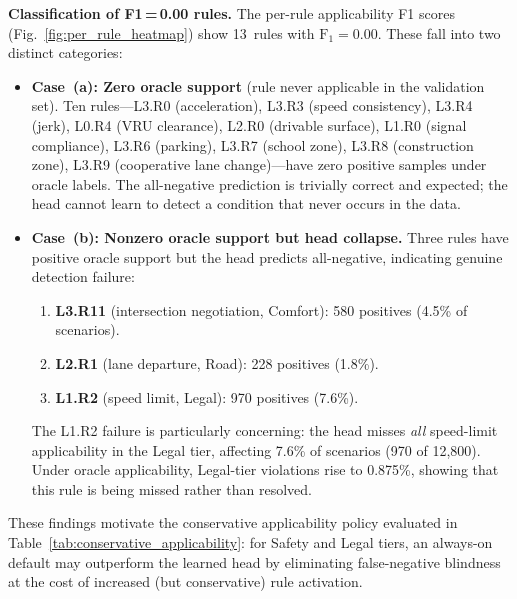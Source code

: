 \noindent\textbf{Classification of F1\,=\,0.00 rules.}
The per-rule applicability F1 scores (Fig.~\ref{fig:per_rule_heatmap}) show 13~rules with $\text{F}_1{=}0.00$.  These fall into two distinct categories:

\begin{itemize}[leftmargin=1.5em]
\item \textbf{Case~(a): Zero oracle support} (rule never applicable in the validation set).  Ten rules---L3.R0 (acceleration), L3.R3 (speed consistency), L3.R4 (jerk), L0.R4 (VRU clearance), L2.R0 (drivable surface), L1.R0 (signal compliance), L3.R6 (parking), L3.R7 (school zone), L3.R8 (construction zone), L3.R9 (cooperative lane change)---have zero positive samples under oracle labels.  The all-negative prediction is trivially correct and expected; the head cannot learn to detect a condition that never occurs in the data.

\item \textbf{Case~(b): Nonzero oracle support but head collapse.}  Three rules have positive oracle support but the head predicts all-negative, indicating genuine detection failure:
\begin{enumerate}[leftmargin=1.5em]
\item \textbf{L3.R11} (intersection negotiation, Comfort): 580 positives (4.5\% of scenarios).
\item \textbf{L2.R1} (lane departure, Road): 228 positives (1.8\%).
\item \textbf{L1.R2} (speed limit, Legal): 970 positives (7.6\%).
\end{enumerate}
The L1.R2 failure is particularly concerning: the head misses \emph{all} speed-limit applicability in the Legal tier, affecting 7.6\% of scenarios (970 of 12{,}800).  Under oracle applicability, Legal-tier violations rise to 0.875\%, showing that this rule is being missed rather than resolved.
\end{itemize}

\noindent These findings motivate the conservative applicability policy evaluated in Table~\ref{tab:conservative_applicability}: for Safety and Legal tiers, an always-on default may outperform the learned head by eliminating false-negative blindness at the cost of increased (but conservative) rule activation.

